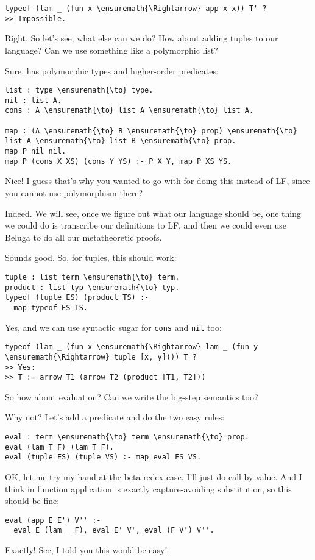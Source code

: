 \begin{verbatim}
typeof (lam _ (fun x \ensuremath{\Rightarrow} app x x)) T' ?
>> Impossible.
\end{verbatim}

 Right. So let's see, what else can we do? How about adding
tuples to our language? Can we use something like a polymorphic list?

 Sure, \lamprolog has polymorphic types and higher-order
predicates:

\begin{verbatim}
list : type \ensuremath{\to} type.
nil : list A.
cons : A \ensuremath{\to} list A \ensuremath{\to} list A.

map : (A \ensuremath{\to} B \ensuremath{\to} prop) \ensuremath{\to} list A \ensuremath{\to} list B \ensuremath{\to} prop.
map P nil nil.
map P (cons X XS) (cons Y YS) :- P X Y, map P XS YS.
\end{verbatim}

 Nice! I guess that's why you wanted to go with \lamprolog for
doing this instead of LF, since you cannot use polymorphism there?

 Indeed. We will see, once we figure out what our language
should be, one thing we could do is transcribe our definitions to LF,
and then we could even use Beluga \citep{pientka2008programming} to do
all our metatheoretic proofs.

 Sounds good. So, for tuples, this should work:

\begin{verbatim}
tuple : list term \ensuremath{\to} term.
product : list typ \ensuremath{\to} typ.
typeof (tuple ES) (product TS) :-
  map typeof ES TS.
\end{verbatim}

 Yes, and we can use syntactic sugar for \texttt{cons} and
\texttt{nil} too:

\begin{verbatim}
typeof (lam _ (fun x \ensuremath{\Rightarrow} lam _ (fun y \ensuremath{\Rightarrow} tuple [x, y]))) T ?
>> Yes:
>> T := arrow T1 (arrow T2 (product [T1, T2]))
\end{verbatim}

 So how about evaluation? Can we write the big-step semantics
too?

 Why not? Let's add a predicate and do the two easy rules:

\begin{verbatim}
eval : term \ensuremath{\to} term \ensuremath{\to} prop.
eval (lam T F) (lam T F).
eval (tuple ES) (tuple VS) :- map eval ES VS.
\end{verbatim}

 OK, let me try my hand at the beta-redex case. I'll just do
call-by-value. And I think in \lamprolog function application is exactly
capture-avoiding substitution, so this should be fine:

\begin{verbatim}
eval (app E E') V'' :-
  eval E (lam _ F), eval E' V', eval (F V') V''.
\end{verbatim}

 Exactly! See, I told you this would be easy!
